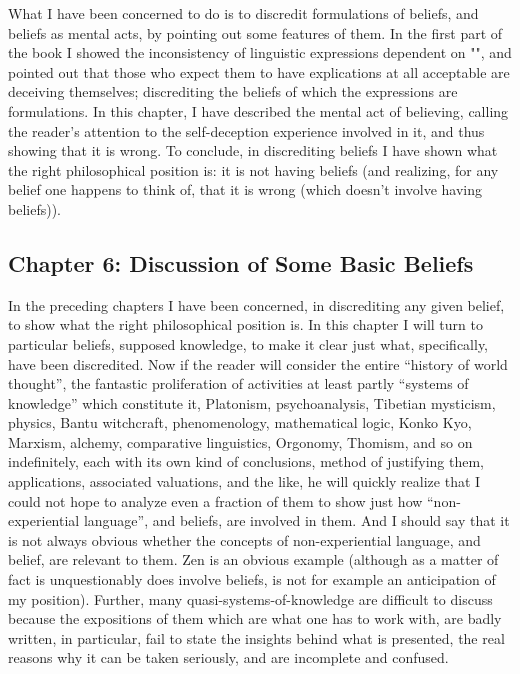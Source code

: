 What I have been concerned to do is to discredit formulations of beliefs, and beliefs as mental acts, by pointing out some features of them. In the first part of the book I showed the inconsistency of linguistic expressions dependent on "", and pointed out that those who expect them to have explications at all acceptable are deceiving themselves; discrediting the beliefs of which the expressions are formulations. In this chapter, I have described the mental act of believing, calling the reader's attention to the self-deception experience involved in it, and thus showing that it is wrong. To conclude, in discrediting beliefs I have shown what the right philosophical position is: it is not having beliefs (and realizing, for any belief one happens to think of, that it is wrong (which doesn't involve having beliefs)). 


\subsection[Chapter 6: Discussion of Some Basic Beliefs][Discussion of Some Basic Beliefs]{Chapter 6: Discussion of Some Basic Beliefs}

In the preceding chapters I have been concerned, in discrediting any given belief, to show what the right philosophical position is. In this chapter I will turn to particular beliefs, supposed knowledge, to make it clear just what, specifically, have been discredited. Now if the reader will consider the entire \enquote{history of world thought}, the fantastic proliferation of activities at least partly \enquote{systems of knowledge} which constitute it, Platonism, psychoanalysis, Tibetian mysticism, physics, Bantu witchcraft, phenomenology, mathematical logic, Konko Kyo, Marxism, alchemy, comparative linguistics, Orgonomy, Thomism, and so on indefinitely, each with its own kind of conclusions, method of justifying them, applications, associated valuations, and the like, he will quickly realize that I could not hope to analyze even a fraction of them to show just how \enquote{non-experiential language}, and beliefs, are involved in them. And I should say that it is not always obvious whether the concepts of non-experiential language, and belief, are relevant to them. Zen is an obvious example (although as a matter of fact is unquestionably does involve beliefs, is not for example an anticipation of my position). Further, many quasi-systems-of-knowledge are difficult to discuss because the expositions of them which are what one has to work with, are badly written, in particular, fail to state the insights behind what is presented, the real reasons why it can be taken seriously, and are incomplete and confused. 

